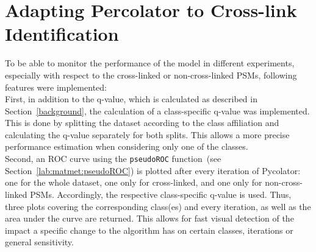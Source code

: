 \section{Adapting Percolator to Cross-link Identification}
To be able to monitor the performance of the model in different experiments, especially with respect to the cross-linked or non-cross-linked PSMs, following features were implemented:\\
First, in addition to the q-value, which is calculated as described in Section~\ref{background}, the calculation of a class-specific q-value was implemented. This is done by splitting the dataset according to the class affiliation and calculating the q-value separately for both splits. This allows a more precise performance estimation when considering only one of the classes.\\
\label{lab:matmet:rocs_after_every_iteration}
Second, an ROC curve using the \texttt{pseudoROC} function~(see Section~\ref{lab:matmet:pseudoROC}) is plotted after every iteration of Pycolator: one for the whole dataset, one only for cross-linked, and one only for non-cross-linked PSMs. Accordingly, the respective class-specific q-value is used. Thus, three plots covering the corresponding class(es) and every iteration, as well as the area under the curve are returned. This allows for fast visual detection of the impact a specific change to the algorithm has on certain classes, iterations or general sensitivity.
